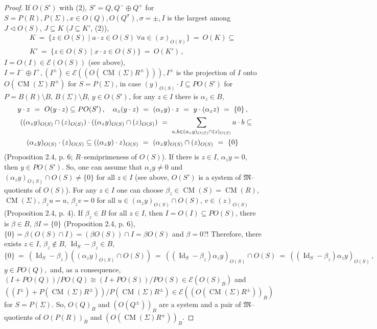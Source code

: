\documentclass[a4paper,11pt]{article}
\DeclareMathOperator{\Id}{Id}
\DeclareMathOperator{\CM}{CM}
\begin{document}
\begin{proof}
If $O(S')$ with (2), ${S'=Q, Q^{-}\oplus Q^{+}}$ for ${S=P(R), P(\Sigma), 
x\in O(Q), O(Q^{\sigma}), \sigma=\pm, I}$ is the largest among ${J\lhd O(S)}$, 
${J\subseteq K}$ (${J\subseteq K'}$, (2)),
\begin{multline*}
K\ =\ \{z\in O(S)\mid a\cdot z\in O(S)\ \forall a\in (x)_{O(S)}\}\ =\ 
O(K)\subseteq
\\ 
K'\ =\ \{z\in O(S)\mid x\cdot z\in O(S)\}\ =\ O(K')\,,
\end{multline*}
${I=O(I)\in \mathcal{E}(O(S))}$ (see above), ${I=I^{-}\oplus I^{+}, 
(I^{\pm})\in \mathcal{E}((O(\CM(\Sigma) R^{\pm}))), I^{\pm}}$ is 
the projection of $I$ onto $O(\CM(\Sigma) R^{\pm})$ for 
${S=P(\Sigma)}$, in case ${(y)_{O(S)}\cdot I\subseteq P O(S')}$ for 
${P=B(R)\setminus B}$, ${B(\Sigma)\setminus B}$, ${y\in O(S')}$,  
for any ${z\in I}$ there is ${\alpha_z\in B}$, 
\begin{multline*}
y\cdot z\ =\ O(y\cdot z)\subseteq P O(S')\,,\quad 
\alpha_z (y\cdot z)\ =\ (\alpha_z y)\cdot z\ =\ y\cdot (\alpha_z z)\ =\ \{0\}\,,
\\
\shoveleft{
((\alpha_z y)_{O(S)}\cap (z)_{O(S)})\cdot ((\alpha_z y)_{O(S)}\cap (z)_{O(S)})
\ =\ \sum_{a, b\in (\alpha_z y)_{O(S)}\cap (z)_{O(S)}} a\cdot b
\subseteq}
\\ 
(\alpha_z y)_{O(S)}\cdot (z)_{O(S)}\subseteq
((\alpha_z y)\cdot z)_{O(S)}\ =\ 
(\alpha_z y)_{O(S)}\cap (z)_{O(S)}\ =\ \{0\}
\end{multline*}
(Proposition 2.4, p. 6; $R$--semiprimeness of $O(S)$). If there is 
${z\in I}$, ${\alpha_z y=0}$, then ${y\in P O(S')}$. So, one can assume 
that ${\alpha_z y\ne 0}$ and ${(\alpha_z y)_{O(S)}\cap O(S)\ne \{0\}}$ 
for all ${z\in I}$ (see above, $O(S')$\linebreak 
is a system of $\mathfrak{M}$--quotients of $O(S)$). For any 
${z\in I}$ one can choose ${\beta_z\in \CM(S)=\CM(R)}$, $\CM(\Sigma)$, 
${\beta_z u=u}$, ${\beta_z v=0}$ for all 
${u\in (\alpha_z y)_{O(S)}\cap O(S)}$, ${v\in (z)_{O(S)}}$ 
(Proposition 2.4, p. 4). If ${\beta_z\in B}$ for all ${z\in I}$, then 
${I=O(I)\subseteq P O(S)}$, there is ${\beta\in B}$, ${\beta I=\{0\}}$ 
(Proposition 2.4, p. 6), 
${\{0\}=\beta (O(S)\cap I)=(\beta O(S))\cap I=\beta O(S)}$ and ${\beta=0}$?! 
Therefore, there exists ${z\in I}$, ${\beta_z\notin B}$, ${\Id_S-\beta_z\in B}$, 
\[
\{0\}\ =\ (\Id_S-\beta_z) ((\alpha_z y)_{O(S)}\cap O(S))\ =\ 
((\Id_S-\beta_z) \alpha_z y)_{O(S)}\cap O(S)\ =\ 
((\Id_S-\beta_z) \alpha_z y)_{O(S)}\,,
\]
${y\in P O(Q),}$ and, as a consequence, 
${(I+P O(Q))/P O(Q)\cong (I+P O(S))/P O(S)\in \mathcal{E}(O(S)_B)}$ 
and ${((I^{\pm})+P (\CM(\Sigma) R^{\pm}))/P (\CM(\Sigma) R^{\pm})\in 
\mathcal{E}((O(\CM(\Sigma) R^{\pm}))_B)}$ for ${S=P(\Sigma)}$. 
So, $O(Q)_B$ and $(O(Q^{\pm}))_B$ are a system and a pair of 
$\mathfrak{M}$--quotients of $O(P(R))_B$ and $(O(\CM(\Sigma) R^{\pm}))_B$. 
\end{proof}
\end{document}
